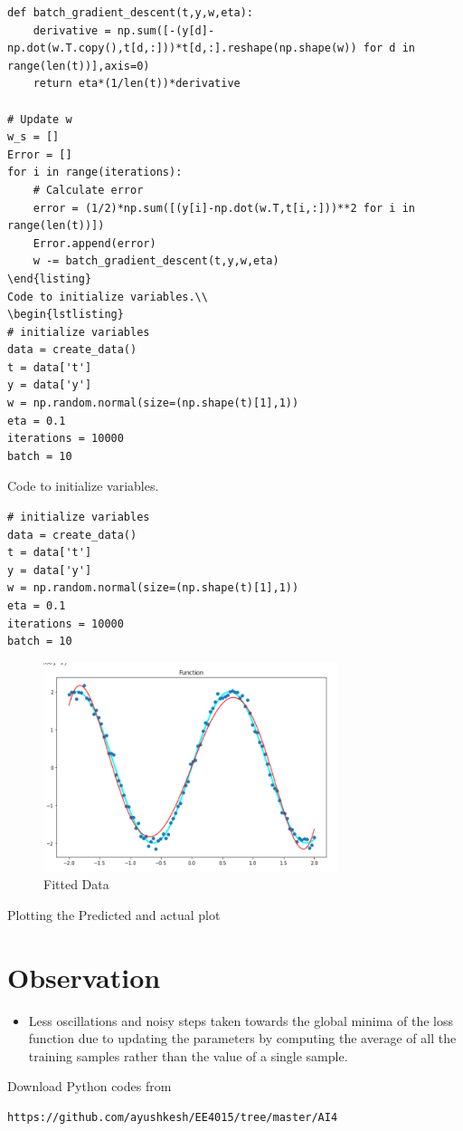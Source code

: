 \documentclass[journal,12pt,twocolumn]{IEEEtran}
\begin{document}
%
\begin{lstlisting}
def batch_gradient_descent(t,y,w,eta):
    derivative = np.sum([-(y[d]-np.dot(w.T.copy(),t[d,:]))*t[d,:].reshape(np.shape(w)) for d in range(len(t))],axis=0)
    return eta*(1/len(t))*derivative

# Update w
w_s = []
Error = []
for i in range(iterations):
    # Calculate error
    error = (1/2)*np.sum([(y[i]-np.dot(w.T,t[i,:]))**2 for i in range(len(t))])
    Error.append(error)
    w -= batch_gradient_descent(t,y,w,eta)
\end{listing}    
Code to initialize variables.\\
\begin{lstlisting}
# initialize variables
data = create_data()
t = data['t']
y = data['y']
w = np.random.normal(size=(np.shape(t)[1],1))
eta = 0.1
iterations = 10000
batch = 10
\end{lstlisting}
Code to initialize variables.\\
\begin{lstlisting}
# initialize variables
data = create_data()
t = data['t']
y = data['y']
w = np.random.normal(size=(np.shape(t)[1],1))
eta = 0.1
iterations = 10000
batch = 10
\end{lstlisting}
\begin{figure}[!h]
\begin{center}
\includegraphics[width=3.4in]{a2.png}
\end{center}
\caption{Fitted Data}
\label{fig:2}
\end{figure}
Plotting the Predicted and actual plot 
\section{Observation}
\begin{itemize}
  \item Less oscillations and noisy steps taken towards the global minima of the loss function due to updating the parameters by computing the average of all the training samples rather than the value of a single sample.
\end{itemize}
Download Python codes from 
%
\begin{lstlisting}
https://github.com/ayushkesh/EE4015/tree/master/AI4
\end{lstlisting}
\end{document}
